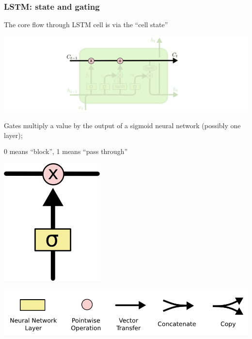 \documentclass[xcolor=dvipsnames]{beamer}
\begin{document}
\begin{frame}
  \frametitle{LSTM:  state and gating}
  
\bi\item The core flow through LSTM cell is via the ``cell state''

\includegraphics[width=.9\textwidth]{olah-lstm/LSTM3-C-line}
\ei
\begin{minipage}[c]{.8\linewidth}
  \bi
\item Gates multiply a value by the output of a sigmoid neural network
  (possibly one layer);
\item 0 means ``block'', 1 means ``pass through''
\ei
\end{minipage}%
\begin{minipage}[c]{.2\linewidth}
  \includegraphics[width=.5\textwidth]{olah-lstm/LSTM3-gate}
\end{minipage}
\includegraphics[width=.5\textwidth]{olah-lstm/LSTM2-notation}
\end{frame}
\end{document}
